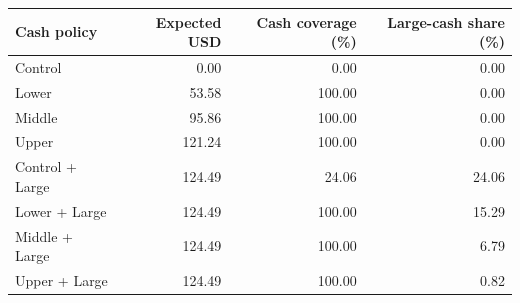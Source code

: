 \begin{tabular}{lrrr}
\toprule
Cash policy & Expected USD & Cash coverage (\%) & Large-cash share (\%) \\
\midrule
Control & 0.00 & 0.00 & 0.00 \\
Lower & 53.58 & 100.00 & 0.00 \\
Middle & 95.86 & 100.00 & 0.00 \\
Upper & 121.24 & 100.00 & 0.00 \\
Control + Large & 124.49 & 24.06 & 24.06 \\
Lower + Large & 124.49 & 100.00 & 15.29 \\
Middle + Large & 124.49 & 100.00 & 6.79 \\
Upper + Large & 124.49 & 100.00 & 0.82 \\
\bottomrule
\end{tabular}
